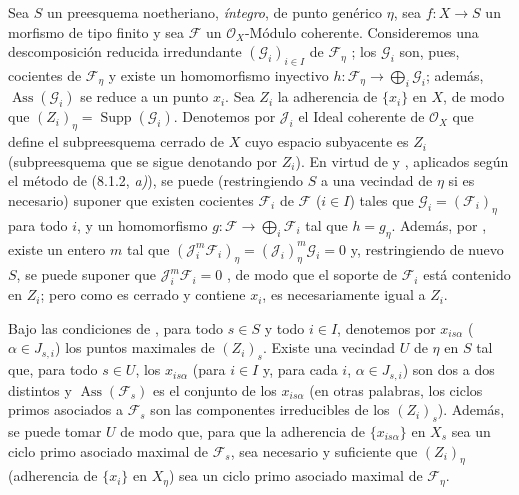 \medskip
\noindent
\emph{}
\label{IV.9.8.2}
Sea $S$ un preesquema noetheriano, \emph{íntegro}, de punto genérico $\eta$, sea $f:X\to S$ un morfismo de tipo finito y sea $\mathcal F$ un $\mathcal O_X$-Módulo coherente.
Consideremos una descomposición reducida irredundante $(\mathcal G_i)_{i\in I}$ de $\mathcal F_\eta$ ; los $\mathcal G_i$ son, pues, cocientes de $\mathcal F_\eta$ y existe un homomorfismo inyectivo $h:\mathcal F_\eta\to\bigoplus_i\mathcal G_i$; además, $\operatorname{Ass}(\mathcal G_i)$ se reduce a un punto $x_i$.
Sea $Z_i$ la adherencia de $\{x_i\}$ en $X$, de modo que $(Z_i)_\eta=\operatorname{Supp}(\mathcal G_i)$.
Denotemos por $\mathcal J_i$ el Ideal coherente de $\mathcal O_X$ que define el subpreesquema cerrado de $X$ cuyo espacio subyacente es $Z_i$ (subpreesquema que se sigue denotando por $Z_i$).
En virtud de  y , aplicados según el método de (8.1.2, \emph{a)}), se puede (restringiendo $S$ a una vecindad de $\eta$ si es necesario) suponer que existen cocientes $\mathcal F_i$ de $\mathcal F$ ($i\in I$) tales que $\mathcal G_i=(\mathcal F_i)_\eta$ para todo $i$, y un homomorfismo $g:\mathcal F\to\bigoplus_i\mathcal F_i$ tal que $h=g_\eta$.
Además, por , existe un entero $m$ tal que $(\mathcal J_i^m\mathcal F_i)_\eta=(\mathcal J_i)_\eta^m\mathcal G_i=0$ y, restringiendo de nuevo $S$, se puede suponer que $\mathcal J_i^m\mathcal F_i=0$ , de modo que el soporte de $\mathcal F_i$ está contenido en $Z_i$; pero como es cerrado y contiene $x_i$, es necesariamente igual a $Z_i$.

\begin{proposition}[9.8.3]
\label{IV.9.8.3}
Bajo las condiciones de \emph{}, para todo $s\in S$ y todo $i\in I$, denotemos por $x_{is\alpha}$ \textup{(}$\alpha\in J_{s,i}$\textup{)} los puntos maximales de $(Z_i)_s$.
Existe una vecindad $U$ de $\eta$ en $S$ tal que, para todo $s\in U$, los $x_{is\alpha}$ (para $i\in I$ y, para cada $i$, $\alpha\in J_{s,i}$) son dos a dos distintos y $\operatorname{Ass}(\mathcal F_s)$ es el conjunto de los $x_{is\alpha}$ (en otras palabras, los ciclos primos asociados a $\mathcal F_s$ son las componentes irreducibles de los $(Z_i)_s$).
Además, se puede tomar $U$ de modo que, para que la adherencia de $\{x_{is\alpha}\}$ en $X_s$ sea un ciclo primo asociado maximal de $\mathcal F_s$, sea necesario y suficiente que $(Z_i)_\eta$ (adherencia de $\{x_i\}$ en $X_\eta$) sea un ciclo primo asociado maximal de $\mathcal F_\eta$.
\end{proposition}

